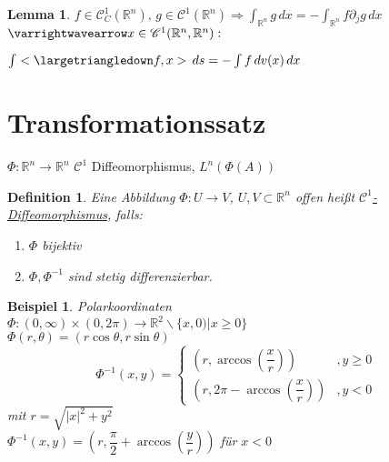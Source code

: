\documentclass[11pt]{memoir}
\theoremstyle{changebreak}
\newtheorem{Definition}{Definition}[chapter]
\newtheorem{Beispiel}{Beispiel}[chapter]
\newtheorem{Lemma}{Lemma}[chapter]
\begin{document}
\begin{Lemma}
$f \in \mathscr C^1_C(\mathbb R^n), \, g\in \mathscr C^1(\mathbb R^n) \Rightarrow \int_{\mathbb R^n}g\, dx = - \int_{\mathbb R^n}f \partial_j g\, dx$ \\
$\varrightwavearrow x \in \mathscr C^1(\mathbb R^n, \mathbb R^n):$
\begin{center}
	$\int <\largetriangledown f, x>\, ds = - \int f\, dv(x) \,dx$
\end{center}
\end{Lemma}

\newpage


\section{Transformationssatz}


$\Phi: \mathbb R^n \rightarrow \mathbb R^n$ $\mathscr C^1$ Diffeomorphismus, $L^n(\Phi(A))$

\begin{Definition}
Eine Abbildung $\Phi: U \rightarrow V$, $U, V \subset \mathbb R^n$ offen heißt \underline{$\mathscr C^1$-Diffeomorphismus}, falls:
\begin{enumerate}
	\item $\Phi$ bijektiv
	\item $\Phi, \Phi^{-1}$ sind stetig differenzierbar.
\end{enumerate}
\end{Definition}

\begin{Beispiel}
\emph{Polarkoordinaten} \\
$\Phi: (0, \infty) \times (0, 2\pi) \rightarrow \mathbb R^2 \backslash \{x, 0)| x \geq 0\}$ \\
$\Phi(r, \theta) = (r \cos \theta, r \sin \theta)$ \\
\begin{equation}
	\Phi^{-1}(x, y) =
	\begin{cases}
		(r, \arccos\left(\dfrac{x}{r}\right)) & , y \geq 0 \\
		(r, 2\pi - \arccos\left(\dfrac{x}{r}\right)) & , y < 0
	\end{cases}
\end{equation}
mit $r = \sqrt{|x|^2 + y^2} $\\
$\Phi^{-1} (x, y) = \left(r, \dfrac{\pi}{2} + \arccos\left(\dfrac{y}{r}\right)\right)$ für $x < 0$

\end{Beispiel}
\end{document}
